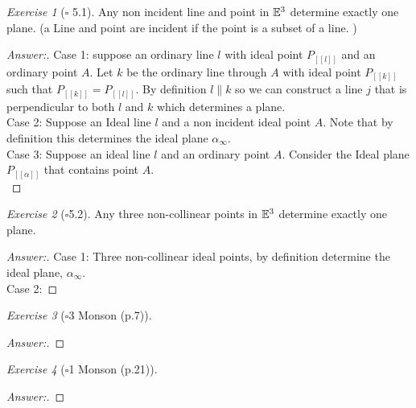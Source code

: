 \documentclass[12pt]{amsart}
\theoremstyle{remark}
\newtheorem*{exercise}{Exercise}%
\newcommand{\EE}{{\ensuremath\mathbb E}}
\theoremstyle{mycomment}
\begin{document}
\begin{exercise} [$\square$ 5.1] Any non incident line and point in $\EE^3$ determine exactly one plane. (a Line and point are incident if the point is a subset of a line. )
\begin{proof}[Answer:] Case 1: suppose an ordinary line $l$ with ideal point $P_[\![l ]\!]$ and an ordinary point $A$. Let $k$ be the ordinary line through $A$ with ideal point $P_[\![k ]\!]$ such that $ P_[\![k ]\!] = P_[\![l ]\!]$. By definition $l \parallel k $ so we can construct a line $j$ that is perpendicular to both $l$ and $k$ which determines a plane. \\

Case 2: Suppose an Ideal line $l$ and a non incident ideal point $A$. Note that by definition this determines the ideal plane $\alpha_\infty$.\\

Case 3: Suppose an ideal line $l$ and an ordinary point $A$. Consider the Ideal plane $P_[\![\alpha ]\!]$ that contains point $A$.\\
\end{proof}
\end{exercise}


\begin{exercise}[$\square$5.2] Any three non-collinear points in $\EE^3$ determine exactly one plane. 
\begin{proof}[Answer:] Case 1: Three non-collinear ideal points, by definition determine the ideal plane, $\alpha_\infty$.\\
Case 2: 




\end{proof}
\end{exercise}

\begin{exercise}[$\square$3 Monson (p.7)] 
\begin{proof}[Answer:]
\end{proof}
\end{exercise}


\begin{exercise}[$\square$1 Monson (p.21)] 
\begin{proof}[Answer:]
\end{proof}
\end{exercise}





 
\end{document}
